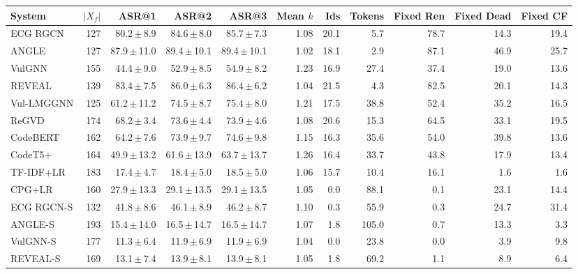 \begin{tabular}{lrrrrrrrrrr}
\toprule
System & $|X_f|$ & ASR@1 & ASR@2 & ASR@3 & Mean $k$ & Ids & Tokens & Fixed Ren & Fixed Dead & Fixed CF \\
\midrule
ECG RGCN & 127 & 80.2\,$\pm$\,8.9 & 84.6\,$\pm$\,8.0 & 85.7\,$\pm$\,7.3 & 1.08 & 20.1 & 5.7 & 78.7 & 14.3 & 19.4 \\
ANGLE & 127 & 87.9\,$\pm$\,11.0 & 89.4\,$\pm$\,10.1 & 89.4\,$\pm$\,10.1 & 1.02 & 18.1 & 2.9 & 87.1 & 46.9 & 25.7 \\
VulGNN & 155 & 44.4\,$\pm$\,9.0 & 52.9\,$\pm$\,8.5 & 54.9\,$\pm$\,8.2 & 1.23 & 16.9 & 27.4 & 37.4 & 19.0 & 13.6 \\
REVEAL & 139 & 83.4\,$\pm$\,7.5 & 86.0\,$\pm$\,6.3 & 86.4\,$\pm$\,6.2 & 1.04 & 21.5 & 4.3 & 82.5 & 20.1 & 14.3 \\
Vul-LMGGNN & 125 & 61.2\,$\pm$\,11.2 & 74.5\,$\pm$\,8.7 & 75.4\,$\pm$\,8.0 & 1.21 & 17.5 & 38.8 & 52.4 & 35.2 & 16.5 \\
ReGVD & 174 & 68.2\,$\pm$\,3.4 & 73.6\,$\pm$\,4.4 & 73.9\,$\pm$\,4.6 & 1.08 & 20.6 & 15.3 & 64.5 & 33.1 & 19.5 \\
CodeBERT & 162 & 64.2\,$\pm$\,7.6 & 73.9\,$\pm$\,9.7 & 74.6\,$\pm$\,9.8 & 1.15 & 16.3 & 35.6 & 54.0 & 39.8 & 13.6 \\
CodeT5+ & 164 & 49.9\,$\pm$\,13.2 & 61.6\,$\pm$\,13.9 & 63.7\,$\pm$\,13.7 & 1.26 & 16.4 & 33.7 & 43.8 & 17.9 & 13.4 \\
TF-IDF+LR & 183 & 17.4\,$\pm$\,4.7 & 18.4\,$\pm$\,5.0 & 18.5\,$\pm$\,5.0 & 1.06 & 15.7 & 10.4 & 16.1 & 1.6 & 1.6 \\
CPG+LR & 160 & 27.9\,$\pm$\,13.3 & 29.1\,$\pm$\,13.5 & 29.1\,$\pm$\,13.5 & 1.05 & 0.0 & 88.1 & 0.1 & 23.1 & 14.4 \\
ECG RGCN-S & 132 & 41.8\,$\pm$\,8.6 & 46.1\,$\pm$\,8.9 & 46.2\,$\pm$\,8.7 & 1.10 & 0.3 & 55.9 & 0.3 & 24.7 & 31.4 \\
ANGLE-S & 193 & 15.4\,$\pm$\,14.0 & 16.5\,$\pm$\,14.7 & 16.5\,$\pm$\,14.7 & 1.07 & 1.8 & 105.0 & 0.7 & 13.3 & 3.3 \\
VulGNN-S & 177 & 11.3\,$\pm$\,6.4 & 11.9\,$\pm$\,6.9 & 11.9\,$\pm$\,6.9 & 1.04 & 0.0 & 23.8 & 0.0 & 3.9 & 9.8 \\
REVEAL-S & 169 & 13.1\,$\pm$\,7.4 & 13.9\,$\pm$\,8.1 & 13.9\,$\pm$\,8.1 & 1.05 & 1.8 & 69.2 & 1.1 & 8.9 & 6.4 \\
\bottomrule
\end{tabular}
